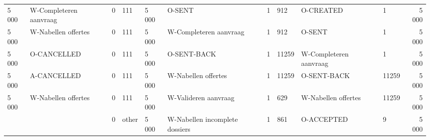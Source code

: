 \begin{tabular}{llllllllllr}
5 000 & W-Completeren aanvraag & 0 & 111 & 5 000 & O-SENT & 1 & 912 & O-CREATED & 1 & 5 000 \\
5 000 & W-Nabellen offertes & 0 & 111 & 5 000 & W-Completeren aanvraag & 1 & 912 & O-SENT & 1 & 5 000 \\
5 000 & O-CANCELLED & 0 & 111 & 5 000 & O-SENT-BACK & 1 & 11259 & W-Completeren aanvraag & 1 & 5 000 \\
5 000 & A-CANCELLED & 0 & 111 & 5 000 & W-Nabellen offertes & 1 & 11259 & O-SENT-BACK & 11259 & 5 000 \\
5 000 & W-Nabellen offertes & 0 & 111 & 5 000 & W-Valideren aanvraag & 1 & 629 & W-Nabellen offertes & 11259 & 5 000 \\
 &  & 0 & other & 5 000 & W-Nabellen incomplete dossiers & 1 & 861 & O-ACCEPTED & 9 & 5 000 \\
\bottomrule
\end{tabular}
